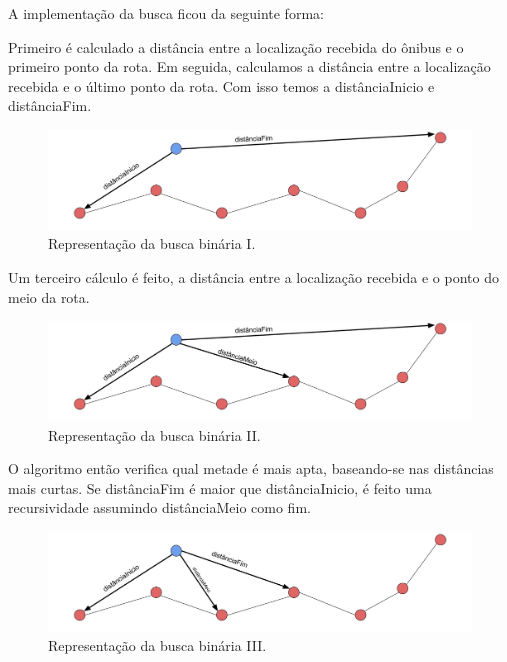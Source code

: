 \documentclass[
	12pt,				%
	oneside,			%
	a4paper,			%
	brazil				%
]{abntex2}
\begin{document}
A implementação da busca ficou da seguinte forma:

Primeiro é calculado a distância entre a localização recebida do ônibus e o primeiro ponto da rota. 
Em seguida, calculamos a distância entre a localização recebida e o último ponto da rota. Com isso temos a distânciaInicio e distânciaFim. 

\begin{figure}[H]
\centering
\includegraphics[width=12cm, center]{images/distanciainicio-distanciafim.png}
\caption{Representação da busca binária I.}
\label{Rotulo}
\end{figure}

Um terceiro cálculo é feito, a distância entre a localização recebida e o ponto do meio da rota.

\begin{figure}[H]
\centering
\includegraphics[width=12cm, center]{images/distanciainicio-distanciafim-distanciomeio.png}
\caption{Representação da busca binária II.}
\label{Rotulo}
\end{figure}

O algoritmo então verifica qual metade é mais apta, baseando-se nas distâncias mais curtas. Se distânciaFim é maior que distânciaInicio, é feito uma recursividade assumindo distânciaMeio como fim.

\begin{figure}[H]
\centering
\includegraphics[width=12cm, center]{images/nova-distancia.png}
\caption{Representação da busca binária III.}
\label{Rotulo}
\end{figure}
\end{document}
